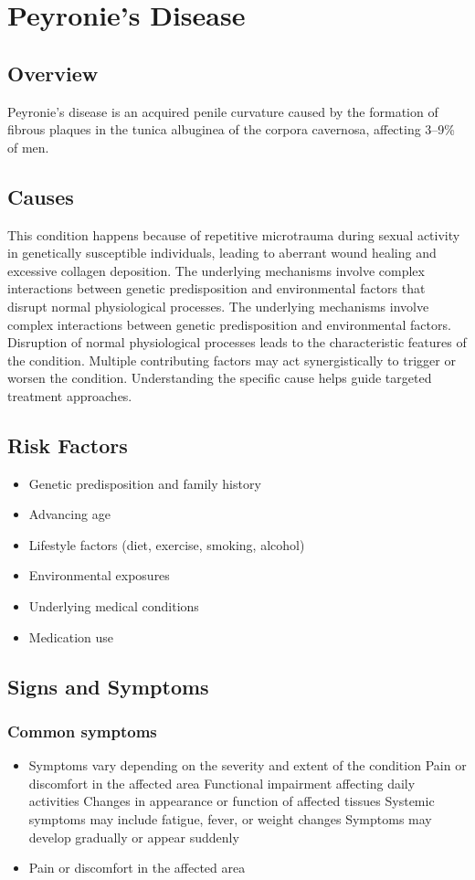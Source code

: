 \chapter{Peyronie's Disease}
\label{sec:Peyronie's Disease}

\section{Overview}
Peyronie's disease is an acquired penile curvature caused by the formation of fibrous plaques in the tunica albuginea of the corpora cavernosa, affecting 3--9\% of men.
\section{Causes}
This condition happens because of repetitive microtrauma during sexual activity in genetically susceptible individuals, leading to aberrant wound healing and excessive collagen deposition. The underlying mechanisms involve complex interactions between genetic predisposition and environmental factors that disrupt normal physiological processes. The underlying mechanisms involve complex interactions between genetic predisposition and environmental factors. Disruption of normal physiological processes leads to the characteristic features of the condition. Multiple contributing factors may act synergistically to trigger or worsen the condition. Understanding the specific cause helps guide targeted treatment approaches.
\section{Risk Factors}


\begin{itemize}[noitemsep]
  \item Genetic predisposition and family history
  \item Advancing age
  \item Lifestyle factors (diet, exercise, smoking, alcohol)
  \item Environmental exposures
  \item Underlying medical conditions
  \item Medication use
\end{itemize}
\section{Signs and Symptoms}

\subsection{Common symptoms}
\begin{itemize}[noitemsep]
  \item Symptoms vary depending on the severity and extent of the condition Pain or discomfort in the affected area Functional impairment affecting daily activities Changes in appearance or function of affected tissues Systemic symptoms may include fatigue, fever, or weight changes Symptoms may develop gradually or appear suddenly
  \item Pain or discomfort in the affected area
  \end{itemize}

